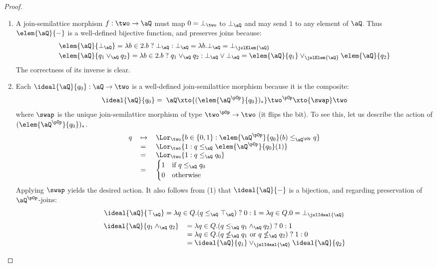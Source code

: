 \documentclass{article}
\begin{document}
\begin{proof}
\item
\begin{enumerate}
\item
A join-semilattice morphism $f : \two \to \aQ$ must map $0 = \bot_\two$ to $\bot_\aQ$ and may send $1$ to any element of $\aQ$. Thus $\elem{\aQ}{-}$ is a well-defined bijective function, and preserves joins because:
\[
\begin{tabular}{l}
$\elem{\aQ}{\bot_\aQ} 
= \lambda b \in 2.b \;?\; \bot_\aQ : \bot_\aQ 
= \lambda b. \bot_\aQ 
= \bot_{\jslElem{\aQ}}$
\\[0.5ex]
$\elem{\aQ}{q_1 \lor_\aQ q_2}
= \lambda b \in 2. b \;?\; q_1 \lor_\aQ q_2 : \bot_\aQ \lor \bot_\aQ 
= \elem{\aQ}{q_1} \lor_{\jslElem{\aQ}} \elem{\aQ}{q_2}$
\end{tabular}
\]
The correctness of its inverse is clear.

\item
Each $\ideal{\aQ}{q_0} : \aQ \to \two$ is a well-defined join-semilattice morphism because it is the composite:
\[
\ideal{\aQ}{q_0} = \; \aQ \xto{(\elem{\aQ^{\pOp}}{q_0})_*} \two^{\pOp} \xto{\swap} \two
\]
where $\swap$ is the unique join-semilattice morphism of type $\two^{\pOp} \to \two$ (it flips the bit). To see this, let us describe the action of $(\elem{\aQ^{\pOp}}{q_0})_*$.
\[
\begin{tabular}{lll}
$q$
& $\mapsto$ &
$\Lor_\two \{ b \in \{0,1\} : \elem{\aQ^{\pOp}}{q_0}(b) \leq_{\aQ^{\pOp}} q \}$
\\& $=$ &
$\Lor_\two \{ 1 : q \leq_\aQ \elem{\aQ^{\pOp}}{q_0}(1)  \}$
\\& $=$ &
$\Lor_\two \{ 1 : q \leq_\aQ q_0  \}$
\\& $=$ &
$\begin{cases} 
1 & \text{if $q \leq_\aQ q_0$}
\\
0 & \text{otherwise}
\end{cases}$
\end{tabular}
\]
Applying $\swap$ yields the desired action. It also follows from (1) that $\ideal{\aQ}{-}$ is a bijection, and regarding preservation of $\aQ^{\pOp}$-joins:
\[
\ideal{\aQ}{\top_\aQ} 
= \lambda q \in Q. (q \leq_\aQ \top_\aQ) \;?\; 0 : 1 
= \lambda q \in Q. 0 = \bot_{\jslIdeal{\aQ}}
\]
\[
\begin{tabular}{lll}
$\ideal{\aQ}{q_1 \land_\aQ q_2}$
&
$= \lambda q \in Q. (q \leq_\aQ q_1 \land_\aQ q_2) \;?\; 0 : 1$
\\&
$= \lambda q \in Q. (q \nleq_\aQ q_1 \text{ or } q \nleq_\aQ q_2) \;?\; 1 : 0$
\\&
$= \ideal{\aQ}{q_1} \lor_{\jslIdeal{\aQ}} \ideal{\aQ}{q_2}$
\end{tabular}
\]


\end{enumerate}
\end{proof}
\end{document}
